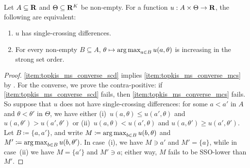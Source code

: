 \begin{namedthm}[\Cref*{theorem:topkis_ms}$\boldsymbol{^\star}$.]
	\label{theorem:topkis_ms_converse}
	Let $A \subseteq \mathbf{R}$ and $\Theta \subseteq \mathbf{R}^K$ be non-empty. For a function $u : A \times \Theta \to \mathbf{R}$, the following are equivalent:
	\begin{enumerate}[label=(\alph*)]
	
		\item \label{item:topkis_ms_converse_scd} $u$ has single-crossing differences.

		\item \label{item:topkis_ms_converse_mcs} For every non-empty $B \subseteq A$, $\theta \mapsto \operatorname*{arg\,max}_{a \in B} u(a,\theta)$ is increasing in the strong set order.
	
	\end{enumerate}
\end{namedthm}

\begin{proof}
	\ref{item:topkis_ms_converse_scd} implies \ref{item:topkis_ms_converse_mcs} by . For the converse, we prove the contra-positive: if \ref{item:topkis_ms_converse_scd} fails, then \ref{item:topkis_ms_converse_mcs} fails. So suppose that $u$ does not have single-crossing differences: for some $a<a'$ in $A$ and $\theta < \theta'$ in $\Theta$, we have either (i)~$u(a,\theta) \leq u(a',\theta)$ and $u(a,\theta') > u(a',\theta')$ or (ii)~$u(a,\theta) < u(a',\theta)$ and $u(a,\theta') \geq u(a',\theta')$. Let $B \coloneqq \{a,a'\}$, and write $M \coloneqq \operatorname*{arg\,max}_{b \in B} u(b,\theta)$ and $M' \coloneqq \operatorname*{arg\,max}_{b \in B} u(b,\theta')$. In case~(i), we have $M \ni a'$ and $M' = \{a\}$, while in case~(ii) we have $M = \{a'\}$ and $M' \ni a$; either way, $M$ fails to be SSO-lower than $M'$.
\end{proof}

